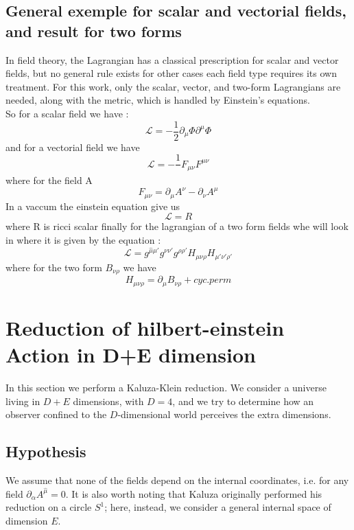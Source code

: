 \documentclass{article}
\begin{document}
\subsection{General exemple for scalar and vectorial fields, and result for two forms}
In field theory, the Lagrangian has a classical prescription for scalar and vector fields, but no general rule exists for other cases 
each field type requires its own treatment. 
For this work, only the scalar, vector, and two-form Lagrangians are needed, along with the metric, which is handled by Einstein's equations.\\
So for a scalar field we have : 
\begin{equation}
    \boxed{\mathcal{L} = - \frac{1}{2} \partial_\mu \Phi \partial^ \mu \Phi}
\end{equation}
and for a vectorial field we have
\begin{equation}
    \boxed{\mathcal{L} = - \frac{1}{}F_{\mu \nu}F^{\mu \nu}}
\end{equation}
where for the field A
\begin{equation*}
    F_{\mu \nu} = \partial_\mu A^ \nu - \partial_\nu A^ \mu
\end{equation*}
In a vaccum the einstein equation give us
\begin{equation*}
    \boxed{\mathcal{L} = R}
\end{equation*}
where R is ricci scalar
finally for the lagrangian of a two form fields
whe will look in \cite{maharana1993noncompact} where it is given by the equation :  
\begin{equation} \label{eq:7}
    \boxed{\mathcal{L} = g^{ \hat \mu  \mu'} g^{\nu \nu'} g^{\rho \rho'} H_{ \mu \nu \rho}H_{ \mu'\nu' \rho'}}
\end{equation}
where for the two form $B_{\nu \rho}$ we have
\begin{equation*}
    H_{ \mu \nu \rho} = \partial_ \mu B_{\nu \rho} + cyc. perm
\end{equation*}

\section{Reduction of hilbert-einstein Action in D+E dimension}
In this section we perform a Kaluza-Klein reduction. We consider a universe living in $D+E$ dimensions, with $D=4$, and we try to determine how an observer confined to the $D$-dimensional world perceives the extra dimensions.
\subsection{Hypothesis}
We assume that none of the fields depend on the internal coordinates, i.e. for any field $\partial_\alpha A^{\hat \mu} = 0$. It is also worth noting that Kaluza originally performed his reduction on a circle $S^1$; here, instead, we consider a general internal space of dimension $E$.
\end{document}
